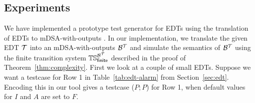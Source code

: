 \subsection{Experiments}
\label{sec:experiments}
We have implemented a prototype test generator for EDTs using the translation of EDTs to mDSA-with-outputs \cite{mDSAcode}. In our implementation, we translate the given EDT $\mathcal{T}$ into an mDSA-with-outputs $\mathcal{B}^{\mathcal{T}}$ and simulate the semantics of $\mathcal{B}^{\mathcal{T}}$ using the finite transition system $\mathbb{TS}_{\mathsf{finite}}^{\mathcal{B}^{\mathcal{T}}}$ described in the proof of Theorem~\ref{thm:complexity}.
First we look at a couple of small EDTs. Suppose we want a testcase for Row 1 in Table~\ref{tab:edt-alarm} from Section~\ref{sec:edt}. Encoding this in our tool gives a testcase ($P; P$) for Row 1, when default values for $I$ and $A$ are set to $F$.
